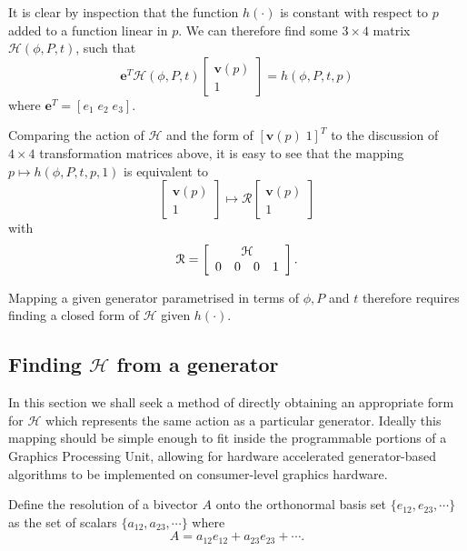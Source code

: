 It is clear by inspection that the function $h(\cdot)$ is 
constant with respect to $p$ added to a function linear in $p$.
We can therefore find some $3\times4$ matrix $\mathcal{H}(\phi, P, t)$, such that
\begin{equation}
\mathbf{e}^T 
 \mathcal{H}(\phi, P, t) \left[
\begin{array}{c}
\mathbf{v}(p) \\ 1
\end{array} 
\right] = h(\phi, P, t, p) \label{eqn:hi}
\end{equation}
where $\mathbf{e}^T = \left[ e_1 \; e_2 \; e_3 \right]$.

Comparing the action of $\mathcal{H}$ and the form of $\left[ \mathbf{v}(p) \; 1 \right]^T$
to the discussion of $4\times4$ transformation matrices above, it is easy to
see that the mapping $p \mapsto h(\phi, P, t, p, 1)$ is equivalent to
\[
\left[
\begin{array}{c}
\mathbf{v}(p) \\ 1
\end{array} 
\right]
\mapsto
\mathcal{R}
\left[
\begin{array}{c}
\mathbf{v}(p) \\ 1
\end{array} 
\right]
\]
with
\[
\mathcal{R} = \left[
\begin{array}{cccc}
\multicolumn{4}{c}{\mathcal{H}} \\
                 0 & 0 & 0 & 1 
\end{array}
\right].
\]

Mapping a given generator parametrised in terms of $\phi, P$ and $t$ therefore
requires finding a closed form of $\mathcal{H}$ given $h(\cdot)$.

\subsection{Finding $\mathcal{H}$ from a generator}

In this section we shall seek a method of directly obtaining an appropriate
form for $\mathcal{H}$ which represents the same action as a particular
generator. Ideally this mapping should be simple enough to fit inside the
programmable portions of a Graphics Processing Unit, allowing for hardware
accelerated generator-based algorithms to be implemented on consumer-level
graphics hardware.

\begin{definition}
Define the resolution of a bivector $A$ onto the orthonormal basis
set $\{e_{12}, e_{23}, \cdots\}$ as the set of scalars $\{a_{12}, a_{23}, \cdots\}$ where
\[A = a_{12}e_{12} + a_{23}e_{23} + \cdots.\]
\end{definition}

